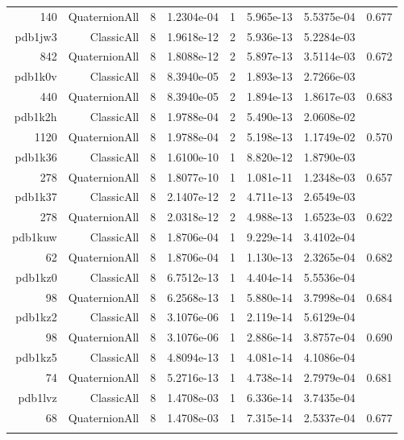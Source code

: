 \begin{xltabular}{\textwidth}{r|rcS[table-format=1.4e+2]cS[table-format=1.3e+2]S[table-format=1.4e+2]S[table-format=-1.3]}
140 & QuaternionAll & 8 & 1.2304e-04 & 1 & 5.965e-13 & 5.5375e-04 & 0.677\\  \addlinespace
pdb1jw3 & ClassicAll & 8 & 1.9618e-12 & 2 & 5.936e-13 & 5.2284e-03 & \\
842 & QuaternionAll & 8 & 1.8088e-12 & 2 & 5.897e-13 & 3.5114e-03 & 0.672\\  \addlinespace
pdb1k0v & ClassicAll & 8 & 8.3940e-05 & 2 & 1.893e-13 & 2.7266e-03 & \\
440 & QuaternionAll & 8 & 8.3940e-05 & 2 & 1.894e-13 & 1.8617e-03 & 0.683\\  \addlinespace
pdb1k2h & ClassicAll & 8 & 1.9788e-04 & 2 & 5.490e-13 & 2.0608e-02 & \\
1120 & QuaternionAll & 8 & 1.9788e-04 & 2 & 5.198e-13 & 1.1749e-02 & 0.570\\  \addlinespace
pdb1k36 & ClassicAll & 8 & 1.6100e-10 & 1 & 8.820e-12 & 1.8790e-03 & \\
278 & QuaternionAll & 8 & 1.8077e-10 & 1 & 1.081e-11 & 1.2348e-03 & 0.657\\  \addlinespace
pdb1k37 & ClassicAll & 8 & 2.1407e-12 & 2 & 4.711e-13 & 2.6549e-03 & \\
278 & QuaternionAll & 8 & 2.0318e-12 & 2 & 4.988e-13 & 1.6523e-03 & 0.622\\  \addlinespace
pdb1kuw & ClassicAll & 8 & 1.8706e-04 & 1 & 9.229e-14 & 3.4102e-04 & \\
62 & QuaternionAll & 8 & 1.8706e-04 & 1 & 1.130e-13 & 2.3265e-04 & 0.682\\  \addlinespace
pdb1kz0 & ClassicAll & 8 & 6.7512e-13 & 1 & 4.404e-14 & 5.5536e-04 & \\
98 & QuaternionAll & 8 & 6.2568e-13 & 1 & 5.880e-14 & 3.7998e-04 & 0.684\\  \addlinespace
pdb1kz2 & ClassicAll & 8 & 3.1076e-06 & 1 & 2.119e-14 & 5.6129e-04 & \\
98 & QuaternionAll & 8 & 3.1076e-06 & 1 & 2.886e-14 & 3.8757e-04 & 0.690\\  \addlinespace
pdb1kz5 & ClassicAll & 8 & 4.8094e-13 & 1 & 4.081e-14 & 4.1086e-04 & \\
74 & QuaternionAll & 8 & 5.2716e-13 & 1 & 4.738e-14 & 2.7979e-04 & 0.681\\  \addlinespace
pdb1lvz & ClassicAll & 8 & 1.4708e-03 & 1 & 6.336e-14 & 3.7435e-04 & \\
68 & QuaternionAll & 8 & 1.4708e-03 & 1 & 7.315e-14 & 2.5337e-04 & 0.677\\  \addlinespace

\end{xltabular}
